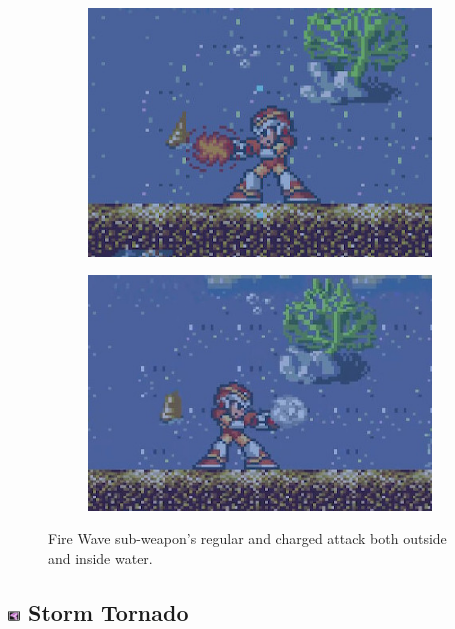 \begin{figure}[htp]
	\ContinuedFloat
	\centering
	\begin{subfigure}{0.34\linewidth}
		\centering
		\includegraphics[width=\linewidth]{figures/X1/weapons/Fire_wave_2.jpg}
	\end{subfigure}
	\begin{subfigure}{0.36\linewidth}
		\centering
		\includegraphics[width=\linewidth]{figures/X1/weapons/Fire_wave_4.jpg}
	\end{subfigure}
	\caption{Fire Wave sub-weapon's regular and charged attack both outside and inside water.}
\end{figure}


\subsection{\includegraphics[width=12px, height=10px]{figures/X1/weapons/Storm_T.jpg} Storm Tornado}\label{Storm_tornado}

